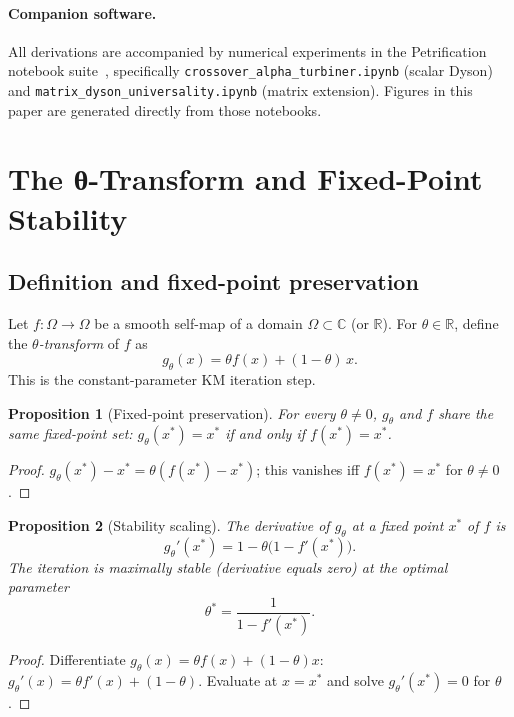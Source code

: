 \documentclass[aps,prb,twocolumn,superscriptaddress,nofootinbib,longbibliography,floatfix]{revtex4-2}
\newcommand{\param}{\theta}
\newcommand{\optparam}{\theta^{*}}
\newcommand{\KMdef}{g_{\param}(x) = \param f(x) + (1-\param)\,x}
\theoremstyle{plain}
\newtheorem{proposition}{Proposition}[section]
\theoremstyle{remark}
\begin{document}
\paragraph{Companion software.}
All derivations are accompanied by numerical experiments in the
Petrification notebook suite~\cite{PetrificationRepo},
specifically \texttt{crossover\_alpha\_turbiner.ipynb} (scalar
Dyson) and \texttt{matrix\_dyson\_universality.ipynb} (matrix
extension).  Figures in this paper are generated directly from
those notebooks.

\section{The θ-Transform and Fixed-Point Stability}
\label{sec:theory}

\subsection{Definition and fixed-point preservation}
\label{ssec:def}

Let $f : \Omega \to \Omega$ be a smooth self-map of a domain
$\Omega \subset \mathbb{C}$ (or $\mathbb{R}$).  For
$\param \in \mathbb{R}$, define the
\emph{$\theta$-transform} of $f$ as
%
\begin{equation}
  \KMdef.
  \label{eq:theta-def}
\end{equation}
%
This is the constant-parameter KM iteration step.

\begin{proposition}[Fixed-point preservation]
\label{prop:fp}
For every $\param \neq 0$, $g_\param$ and $f$ share the same
fixed-point set: $g_\param(x^*) = x^*$ if and only if
$f(x^*) = x^*$.
\end{proposition}
\begin{proof}
$g_\param(x^*) - x^* = \param(f(x^*) - x^*)$; this vanishes
iff $f(x^*) = x^*$ for $\param \neq 0$.
\end{proof}

\begin{proposition}[Stability scaling]
\label{prop:stab}
The derivative of $g_\param$ at a fixed point $x^*$ of $f$ is
%
\begin{equation}
  g_\param'(x^*) = 1 - \param\bigl(1 - f'(x^*)\bigr).
  \label{eq:deriv}
\end{equation}
%
The iteration is maximally stable (derivative equals zero)
at the \emph{optimal parameter}
%
\begin{equation}
  \optparam = \frac{1}{1 - f'(x^*)}.
  \label{eq:opt-theta}
\end{equation}
\end{proposition}
\begin{proof}
Differentiate $g_\param(x) = \param f(x) + (1-\param)x$:
$g_\param'(x) = \param f'(x) + (1-\param)$.  Evaluate at
$x = x^*$ and solve $g_\param'(x^*) = 0$ for $\param$.
\end{proof}
\end{document}
